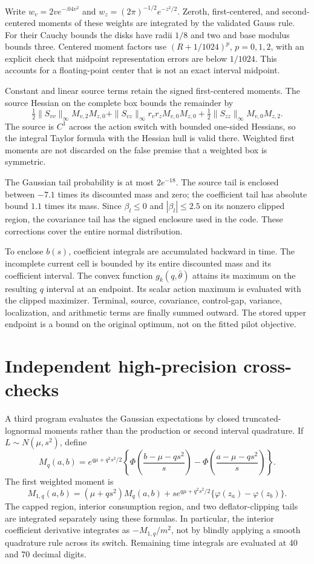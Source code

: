 Write $w_v=2ve^{-.04v^2}$ and $w_z=(2\pi)^{-1/2}e^{-z^2/2}$. Zeroth, first-centered, and second-centered moments of these weights are integrated by the validated Gauss rule. For their Cauchy bounds the disks have radii $1/8$ and two and base modulus bounds three. Centered moment factors use $(R+1/1024)^p$, $p=0,1,2$, with an explicit check that midpoint representation errors are below $1/1024$. This accounts for a floating-point center that is not an exact interval midpoint.

Constant and linear source terms retain the signed first-centered moments. The source Hessian on the complete box bounds the remainder by
\[
 \tfrac12\|S_{vv}\|_\infty M_{v,2}M_{z,0}
 +\|S_{vz}\|_\infty r_vr_zM_{v,0}M_{z,0}
 +\tfrac12\|S_{zz}\|_\infty M_{v,0}M_{z,2}.
\]
The source is $C^1$ across the action switch with bounded one-sided Hessians, so the integral Taylor formula with the Hessian hull is valid there. Weighted first moments are not discarded on the false premise that a weighted box is symmetric.

The Gaussian tail probability is at most $2e^{-18}$. The source tail is enclosed between $-7.1$ times its discounted mass and zero; the coefficient tail has absolute bound $1.1$ times its mass. Since $\beta_l\leq0$ and $|\beta_l|\leq2.5$ on its nonzero clipped region, the covariance tail has the signed enclosure used in the code. These corrections cover the entire normal distribution.

To enclose $b(s)$, coefficient integrals are accumulated backward in time. The incomplete current cell is bounded by its entire discounted mass and its coefficient interval. The convex function $g_k(q,\bar\theta)$ attains its maximum on the resulting $q$ interval at an endpoint. Its scalar action maximum is evaluated with the clipped maximizer. Terminal, source, covariance, control-gap, variance, localization, and arithmetic terms are finally summed outward. The stored upper endpoint is a bound on the original optimum, not on the fitted pilot objective.

\section{Independent high-precision cross-checks}
A third program evaluates the Gaussian expectations by closed truncated-lognormal moments rather than the production or second interval quadrature. If $L\sim N(\mu,s^2)$, define
\[
 M_q(a,b)=e^{q\mu+q^2s^2/2}
 \left\{\Phi\!\left(\frac{b-\mu-qs^2}{s}\right)
       -\Phi\!\left(\frac{a-\mu-qs^2}{s}\right)\right\}.
\]
The first weighted moment is
\[
 M_{1,q}(a,b)=(\mu+qs^2)M_q(a,b)
 +s e^{q\mu+q^2s^2/2}\{\varphi(z_a)-\varphi(z_b)\}.
\]
The capped region, interior consumption region, and two deflator-clipping tails are integrated separately using these formulas. In particular, the interior coefficient derivative integrates as $-M_{1,q}/m^2$, not by blindly applying a smooth quadrature rule across its switch. Remaining time integrals are evaluated at 40 and 70 decimal digits.

